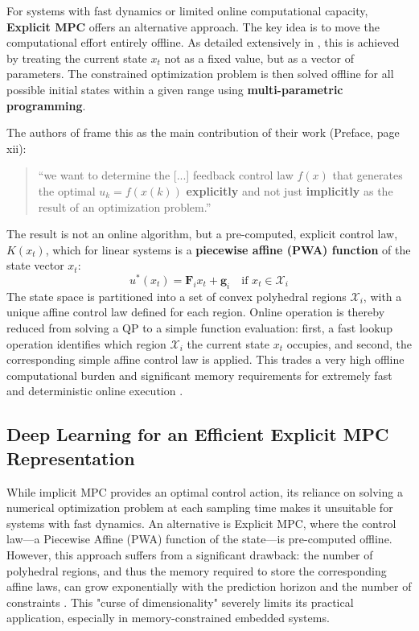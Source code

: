 For systems with fast dynamics or limited online computational capacity, \textbf{Explicit MPC} offers an alternative approach. The key idea is to move the computational effort entirely offline. As detailed extensively in \cite{borrelli2017predictive}, this is achieved by treating the current state $x_t$ not as a fixed value, but as a vector of parameters. The constrained optimization problem is then solved offline for all possible initial states within a given range using \textbf{multi-parametric programming}.

\noindent
The authors of \cite{borrelli2017predictive} frame this as the main contribution of their work (Preface, page xii): 
\begin{quote}
“we want to determine the [...] feedback control law $f(x)$ that generates the optimal $u_k = f(x(k))$ \textbf{explicitly} and not just \textbf{implicitly} as the result of an optimization problem.”
\end{quote}
\noindent
The result is not an online algorithm, but a pre-computed, explicit control law, $K(x_t)$, which for linear systems is a \textbf{piecewise affine (PWA) function} of the state vector $x_t$:
\begin{equation}
u^*(x_t) = \mathbf{F}_i x_t + \mathbf{g}_i \quad \text{if } x_t \in \mathcal{X}_i
\end{equation}
\noindent
The state space is partitioned into a set of convex polyhedral regions $\mathcal{X}_i$, with a unique affine control law defined for each region. Online operation is thereby reduced from solving a QP to a simple function evaluation: first, a fast lookup operation identifies which region $\mathcal{X}_i$ the current state $x_t$ occupies, and second, the corresponding simple affine control law is applied. This trades a very high offline computational burden and significant memory requirements for extremely fast and deterministic online execution \cite{bemporad2013explicit, borrelli2017predictive}.
\subsection{Deep Learning for an Efficient Explicit MPC Representation}

While implicit MPC provides an optimal control action, its reliance on solving a numerical optimization problem at each sampling time makes it unsuitable for systems with fast dynamics. An alternative is Explicit MPC, where the control law---a Piecewise Affine (PWA) function of the state---is pre-computed offline. However, this approach suffers from a significant drawback: the number of polyhedral regions, and thus the memory required to store the corresponding affine laws, can grow exponentially with the prediction horizon and the number of constraints \cite{karg2018efficient}. This "curse of dimensionality" severely limits its practical application, especially in memory-constrained embedded systems.

